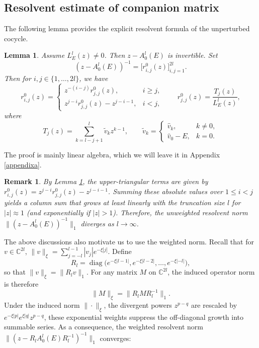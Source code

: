 \documentclass[reqno,11pt]{amsart}
\newtheorem{lemma}{Lemma}[section]
\newtheorem{remark}{Remark}[section]
\begin{document}
\subsection{Resolvent estimate of companion matrix}


The following lemma provides the explicit resolvent formula of the unperturbed cocycle.

\begin{lemma}
\label{lem:unperturbed-resolvent}
Assume $L^{l}_{E}(z)\neq 0$. Then $z-A_{0}^{l}(E)$ is invertible. Set
$$
(z-A_{0}^{l}(E))^{-1} = \bigl[r_{i,j}^0(z)\bigr]_{i,j=1}^{2l}.
$$
Then for $i,j\in\{1,\dots,2l\}$, we have
$$
r_{i,j}^0(z)=
\begin{cases}
z^{-(i-j)}r_{j,j}^0(z), & i\ge j,\\
z^{j-i}r_{j,j}^0(z)-z^{j-i-1}, & i<j,
\end{cases}
\qquad 
r_{j,j}^0(z) = \frac{T_j(z)}{L^{l}_{E}(z)},
$$
where  
$$
T_j(z)=\sum_{k=l-j+1}^{l}\widetilde v_k z^{k-1}, \qquad \widetilde v_k=
\begin{cases}
\hat{v}_k, & k\neq 0,\\
\hat{v}_0-E, & k=0.
\end{cases}
$$
\end{lemma}
The proof is mainly linear algebra, which we will leave it in Appendix \ref{appendixa}. 



\begin{remark}\label{abnormal}
By Lemma \ref{lem:unperturbed-resolvent}, the upper-triangular terms  are given by $r_{i,j}^0(z) = z^{j-i}r_{j,j}^0(z) - z^{j-i-1}$. Summing these absolute values over $1 \le i < j$ yields a column sum that grows at least linearly with the truncation size $l$ for $|z| \approx 1$ (and exponentially if $|z| > 1$). Therefore, the  unweighted resolvent norm $\|(z - A_{0}^{l}(E))^{-1}\|_{1}$ diverges as $l \to \infty$. 
\end{remark}

 



The above discussions also motivate us to use the weighted norm. 
Recall that for $v\in\mathbb{C}^{2l}$, $\|v\|_\xi = \sum_{j=-l}^{l-1} |v_j| e^{-\xi|j|}$. 
Define
$$
R_l = \operatorname{diag}\bigl(e^{-\xi|l-1|}, e^{-\xi|l-2|}, \dots, e^{-\xi|-l|}\bigr),
$$
so that $\|v\|_\xi = \|R_l v\|_{1}$. 
For any matrix $M$ on $\mathbb{C}^{2l}$, the induced operator norm is therefore
\begin{equation}\label{equ:induced}
\|M\|_\xi = \|R_l M R_l^{-1}\|_{1}.
\end{equation}
Under the induced norm $\|\cdot\|_\xi$, the divergent powers $z^{p-q}$ are  rescaled by $e^{-\xi|p|}e^{\xi|q|}z^{p-q}$, these exponential weights  suppress the off-diagonal growth into summable series. 
As a consequence,  the  weighted resolvent norm $\|(z-R_l A_{0}^{l}(E)R_l^{-1})^{-1}\|_{1}$  converges: 
\end{document}
